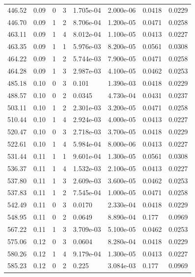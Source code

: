 \documentclass[preview]{standalone}
\begin{document}
{{{\begin{tabular}{L{1.2cm}C{1.2cm} C{0.3cm}C{0.5cm} C{1.4cm}C{1.4cm} C{1.4cm}C{1.4cm}}
  446.52  &  0.09  & 0     &  3 &  1.705e-04  & 2.000e-06  & 0.0418 &  0.0229   \\ 
  446.70  &  0.09  & 1     &  2 &  8.706e-04  & 1.200e-05  & 0.0471 &  0.0258   \\ 
  463.11  &  0.09  & 1     &  4 &  8.012e-04  & 1.100e-05  & 0.0413 &  0.0227   \\ 
  463.35  &  0.09  & 1     &  1 &  5.976e-03  & 8.200e-05  & 0.0561 &  0.0308   \\ 
  464.22  &  0.09  & 1     &  2 &  5.744e-03  & 7.900e-05  & 0.0471 &  0.0258   \\ 
  464.28  &  0.09  & 1     &  3 &  2.987e-03  & 4.100e-05  & 0.0462 &  0.0253   \\ 
  485.18  &  0.10  & 0     &  3 &  0.101  & 1.390e-03  & 0.0418 &  0.0229   \\ 
  488.57  &  0.10  & 0     &  2 &  0.0345  & 4.730e-04  & 0.0431 &  0.0237   \\ 
  503.11  &  0.10  & 1     &  2 &  2.301e-03  & 3.200e-05  & 0.0471 &  0.0258   \\ 
  510.44  &  0.10  & 1     &  4 &  2.924e-03  & 4.000e-05  & 0.0413 &  0.0227   \\ 
  520.47  &  0.10  & 0     &  3 &  2.718e-03  & 3.700e-05  & 0.0418 &  0.0229   \\ 
  522.61  &  0.10  & 1     &  4 &  5.984e-04  & 8.000e-06  & 0.0413 &  0.0227   \\ 
  531.44  &  0.11  & 1     &  1 &  9.601e-04  & 1.300e-05  & 0.0561 &  0.0308   \\ 
  536.37  &  0.11  & 1     &  4 &  1.532e-03  & 2.100e-05  & 0.0413 &  0.0227   \\ 
  537.80  &  0.11  & 1     &  3 &  2.609e-03  & 3.600e-05  & 0.0462 &  0.0253   \\ 
  537.83  &  0.11  & 1     &  2 &  7.545e-04  & 1.000e-05  & 0.0471 &  0.0258   \\ 
  542.49  &  0.11  & 0     &  3 &  0.0170  & 2.330e-04  & 0.0418 &  0.0229   \\ 
  548.95  &  0.11  & 0     &  2 &  0.0649  & 8.890e-04  & 0.177 &  0.0969   \\ 
  567.22  &  0.11  & 1     &  3 &  3.709e-03  & 5.100e-05  & 0.0462 &  0.0253   \\ 
  575.06  &  0.12  & 0     &  3 &  0.0604  & 8.280e-04  & 0.0418 &  0.0229   \\ 
  580.26  &  0.12  & 1     &  4 &  9.179e-04  & 1.300e-05  & 0.0413 &  0.0227   \\ 
  585.23  &  0.12  & 0     &  2 &  0.225  & 3.084e-03  & 0.177 &  0.0969   \\ 

\end{tabular}}}}
\end{document}

